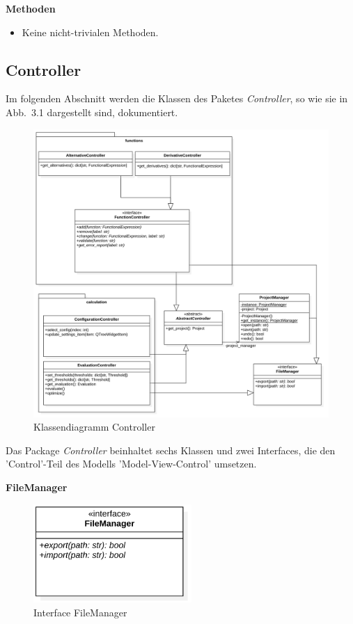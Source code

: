 \documentclass{article}
\begin{document}
\begin{itemize}
\textbf{Methoden}
\begin{itemize}\setlength\itemsep{3em}
\item[] Keine nicht-trivialen Methoden.
\end{itemize}

\newpage
\subsection{Controller}

Im folgenden Abschnitt werden die Klassen des Paketes \emph{Controller}, so wie sie in Abb.~3.1 dargestellt sind, dokumentiert.

\begin{figure}[H]%
    \centering
    \includegraphics[width=13cm]{entwurf/Floriane/ControllerKlassendiagramm.png}
    \caption{Klassendiagramm Controller}
\end{figure}

Das Package \textit{Controller} beinhaltet sechs Klassen und zwei Interfaces, die den 'Control'-Teil des Modells 'Model-View-Control' umsetzen.

\newpage
\textbf{\large{FileManager}}
\begin{figure}[H]%
    \centering
    \includegraphics[width=6cm]{entwurf/Floriane/FileManager.png}
    \caption{Interface FileManager}
\end{figure}


\end{itemize}
\end{document}
